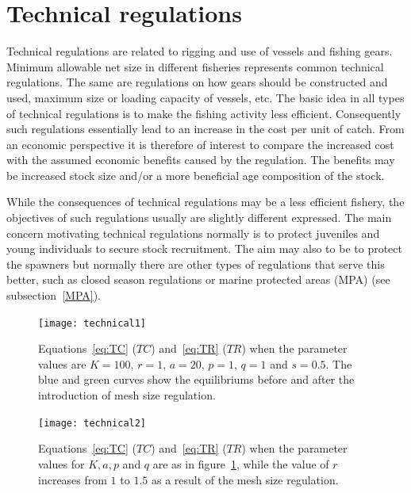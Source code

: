 \documentclass[11pt,fleqn]{book} %
\begin{document}
\section{Technical regulations} \label{Mesh size regulation}

Technical regulations are related to rigging and use of vessels and fishing gears. Minimum allowable net size in different fisheries represents common technical regulations. The same are regulations on how gears should be constructed and used, maximum size or loading capacity of vessels, etc. The basic idea in all types of technical regulations is to make the fishing activity less efficient. Consequently such regulations essentially lead to an increase in the cost per unit of catch. From an economic perspective it is therefore of interest to compare the increased cost with the assumed economic benefits caused by the regulation. The benefits may be increased stock size and/or a more beneficial age composition of the stock.

While the consequences of technical regulations may be a less efficient fishery, the objectives of such regulations usually are slightly different expressed. The main concern motivating technical regulations normally is to protect juveniles and young individuals to secure stock recruitment. The aim may also to be to protect the spawners but normally there are other types of regulations that serve this better, such as closed season regulations or marine protected areas (MPA) (see subsection~\ref{MPA}).

\begin{figure}[!ht]
\centering
\texttt{[image: technical1]}
\caption{Equations~\ref{eq:TC} ($TC$) and~\ref{eq:TR} ($TR$) when the parameter values are $K = 100$, $r = 1$, $a = 20$, $p = 1$, $q = 1$ and $s = 0.5$. The blue and green curves show the equilibriums before and after the introduction of mesh size regulation.}
\label{fig:technical1}
\end{figure}

\begin{figure}[!ht]
\centering
\texttt{[image: technical2]}
\caption{Equations~\ref{eq:TC} ($TC$) and~\ref{eq:TR} ($TR$) when the parameter values for $K, a, p$ and $q$ are as in figure~\ref{fig:technical1}, while the value of $r$ increases from $1$ to $1.5$ as a result of the mesh size regulation.}
\label{fig:technical2}
\end{figure}
\end{document}
